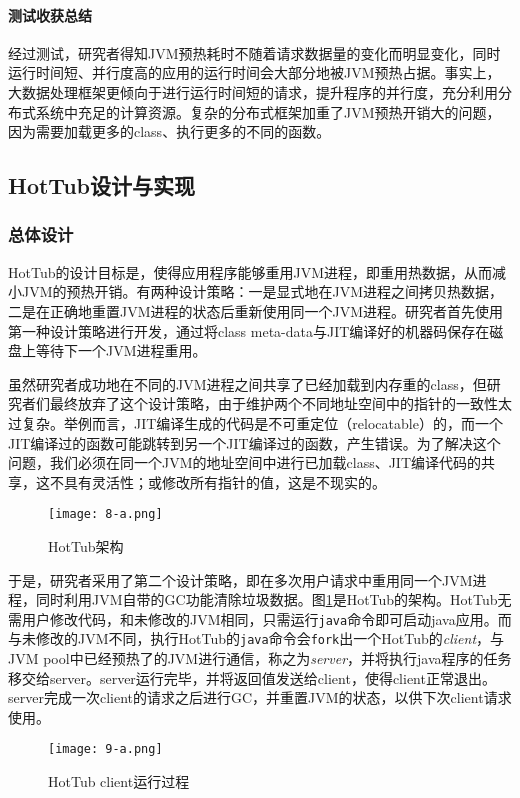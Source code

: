 \documentclass[lang=cn,12pt,a4paper,cite=authoryear]{elegantpaper}
\begin{document}
\begin{figure*}[!htp]
\paragraph{测试收获总结}
经过测试，研究者得知JVM预热耗时不随着请求数据量的变化而明显变化，同时运行时间短、并行度高的应用的运行时间会大部分地被JVM预热占据。事实上，大数据处理框架更倾向于进行运行时间短的请求，提升程序的并行度，充分利用分布式系统中充足的计算资源。复杂的分布式框架加重了JVM预热开销大的问题，因为需要加载更多的class、执行更多的不同的函数。

\subsection{HotTub设计与实现}
\subsubsection{总体设计}
HotTub的设计目标是，使得应用程序能够重用JVM进程，即重用热数据，从而减小JVM的预热开销。有两种设计策略：一是显式地在JVM进程之间拷贝热数据，二是在正确地重置JVM进程的状态后重新使用同一个JVM进程。研究者首先使用第一种设计策略进行开发，通过将class meta-data与JIT编译好的机器码保存在磁盘上等待下一个JVM进程重用。

虽然研究者成功地在不同的JVM进程之间共享了已经加载到内存重的class，但研究者们最终放弃了这个设计策略，由于维护两个不同地址空间中的指针的一致性太过复杂。举例而言，JIT编译生成的代码是不可重定位（relocatable）的，而一个JIT编译过的函数可能跳转到另一个JIT编译过的函数，产生错误。为了解决这个问题，我们必须在同一个JVM的地址空间中进行已加载class、JIT编译代码的共享，这不具有灵活性；或修改所有指针的值，这是不现实的。

\begin{figure}[!htp]
  \centering
  \texttt{[image: 8-a.png]}
  \caption{HotTub架构}
  \label{fig:arch}
\end{figure}

于是，研究者采用了第二个设计策略，即在多次用户请求中重用同一个JVM进程，同时利用JVM自带的GC功能清除垃圾数据。图\ref{fig:arch}是HotTub的架构。HotTub无需用户修改代码，和未修改的JVM相同，只需运行\texttt{java}命令即可启动java应用。而与未修改的JVM不同，执行HotTub的\texttt{java}命令会\texttt{fork}出一个HotTub的\textit{client}，与JVM pool中已经预热了的JVM进行通信，称之为\textit{server}，并将执行java程序的任务移交给server。server运行完毕，并将返回值发送给client，使得client正常退出。server完成一次client的请求之后进行GC，并重置JVM的状态，以供下次client请求使用。

\begin{figure}[!htp]
  \centering
  \texttt{[image: 9-a.png]}
  \caption{HotTub client运行过程}
  \label{fig:client}
\end{figure}


\end{figure*}
\end{document}
